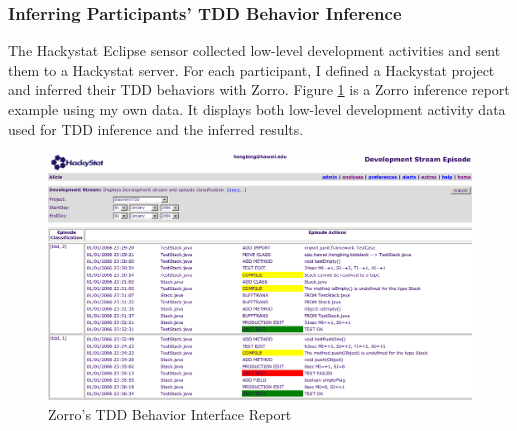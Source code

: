 \subsubsection{Inferring Participants' TDD Behavior Inference}
The Hackystat Eclipse sensor collected low-level development
activities and sent them to a Hackystat server. For each participant,
I defined a Hackystat project and inferred their TDD behaviors with
Zorro. Figure \ref{fig:gui} is a Zorro inference report example using my 
own data. It displays both low-level development activity data used 
for TDD inference and the inferred results. 
\begin{figure}[htbp]
  \centering
  \includegraphics[width=1.0\textwidth]{figs/Zorro-Gui.eps}
  \caption{Zorro's TDD Behavior Interface Report}\label{fig:gui}
\end{figure}

